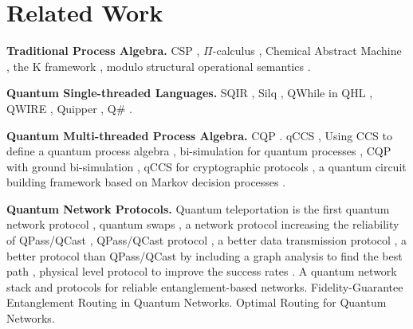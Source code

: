 \section{Related Work}
\label{Related Work}

\noindent\textbf{Traditional Process Algebra.}
CSP \cite{CSPm,FDR2}, $\Pi$-calculus \cite{DBLP:conf/concur/Sangiori93}, Chemical Abstract Machine \cite{BERRY1992217},
the K framework \cite{rosu-serbanuta-2010-jlap}, modulo structural operational semantics \cite{MOSSES2004195}.

\noindent\textbf{Quantum Single-threaded Languages.}
SQIR \cite{VOQC}, Silq \cite{sliqlanguage}, QWhile in QHL \cite{10.1007/s00165-018-0465-3}, QWIRE \cite{Rand2018ReQWIRERA}, Quipper \cite{10.1145/2491956.2462177}, Q\# \cite{qsharp}.

\noindent\textbf{Quantum Multi-threaded Process Algebra.}
CQP \cite{9165801}. qCCS \cite{10.1145/1507244.1507249}, Using CCS to define a quantum process algebra \cite{10.1145/977091.977108},
bi-simulation for quantum processes \cite{10.1145/2400676.2400680}, CQP with ground bi-simulation \cite{10.1007/978-3-030-45237-7_2},
qCCS for cryptographic protocols \cite{https://doi.org/10.48550/arxiv.1507.05278},
a quantum circuit building framework based on Markov decision processes \cite{https://doi.org/10.48550/arxiv.2207.03403}.

\noindent\textbf{Quantum Network Protocols.}
Quantum teleportation is the first quantum network protocol \cite{PhysRevLett.70.1895},
quantum swaps \cite{fundamentallimits,aam9288,10.1145/3386367.3431293}, 
a network protocol increasing the reliability of QPass/QCast \cite{Pirker_2019},
QPass/QCast protocol \cite{10.1145/3387514.3405853},
a better data transmission protocol \cite{PhysRevResearch.4.043064},
a better protocol than QPass/QCast by including a graph analysis to find the best path \cite{https://doi.org/10.48550/arxiv.1907.11630},
physical level protocol to improve the success rates \cite{10.1145/3341302.3342070}.
A quantum network stack and protocols for reliable entanglement-based networks\cite{Pirker_2019}.
Fidelity-Guarantee Entanglement Routing in Quantum Networks\cite{10.48550/arxiv.2111.07764}.
Optimal Routing for Quantum Networks\cite{8068178}.  

